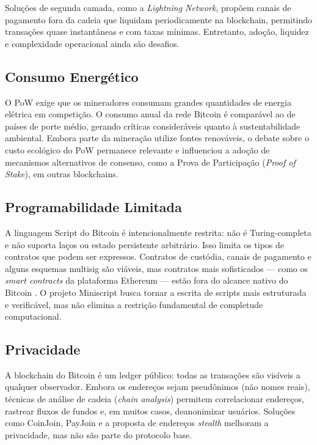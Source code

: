 \documentclass[12pt,a4paper]{report}
\begin{document}
Soluções de segunda camada, como a \textit{Lightning Network}, propõem canais de pagamento fora da cadeia que liquidam periodicamente na blockchain, permitindo transações quase instantâneas e com taxas mínimas. Entretanto, adoção, liquidez e complexidade operacional ainda são desafios.

\subsection{Consumo Energético}

O PoW exige que os mineradores consumam grandes quantidades de energia elétrica em competição. O consumo anual da rede Bitcoin é comparável ao de países de porte médio, gerando críticas consideráveis quanto à sustentabilidade ambiental. Embora parte da mineração utilize fontes renováveis, o debate sobre o custo ecológico do PoW permanece relevante e influenciou a adoção de mecanismos alternativos de consenso, como a Prova de Participação (\textit{Proof of Stake}), em outras blockchains.

\subsection{Programabilidade Limitada}

A linguagem Script do Bitcoin é intencionalmente restrita: não é Turing-completa e não suporta laços ou estado persistente arbitrário. Isso limita os tipos de contratos que podem ser expressos. Contratos de custódia, canais de pagamento e alguns esquemas multisig são viáveis, mas contratos mais sofisticados --- como os \textit{smart contracts} da plataforma Ethereum --- estão fora do alcance nativo do Bitcoin \cite{Bashir2023}. O projeto Miniscript busca tornar a escrita de scripts mais estruturada e verificável, mas não elimina a restrição fundamental de completude computacional.

\subsection{Privacidade}

A blockchain do Bitcoin é um ledger público: todas as transações são visíveis a qualquer observador. Embora os endereços sejam pseudônimos (não nomes reais), técnicas de análise de cadeia (\textit{chain analysis}) permitem correlacionar endereços, rastrear fluxos de fundos e, em muitos casos, deanonimizar usuários. Soluções como CoinJoin, PayJoin e a proposta de endereços \textit{stealth} melhoram a privacidade, mas não são parte do protocolo base.
\end{document}
